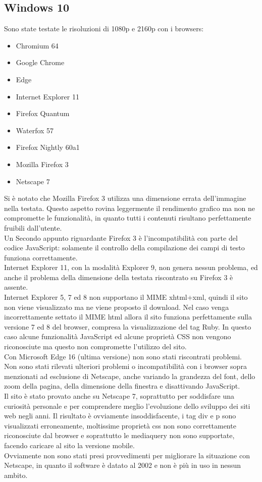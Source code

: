 \documentclass[openany, a4paper, 12pt]{report}
\begin{document}
				\subsection{Windows 10}
				Sono state testate le risoluzioni di 1080p e 2160p con i browsers:
				\begin{itemize}
					\item Chromium 64
					\item Google Chrome
					\item Edge
					\item Internet Explorer 11
					\item Firefox Quantum
					\item Waterfox 57
					\item Firefox Nightly 60a1
					\item Mozilla Firefox 3
					\item Netscape 7
				\end{itemize}
				Si è notato che Mozilla Firefox 3 utilizza una dimensione errata dell'immagine nella testata. Questo aspetto rovina leggermente il rendimento grafico ma non ne compromette le funzionalità, in quanto tutti i contenuti risultano perfettamente fruibili dall'utente.\\
				Un Secondo appunto riguardante Firefox 3 è l'incompatibilità con parte del codice JavaScript: solamente il controllo della compilazione dei campi di testo funziona correttamente.\\
				Internet Explorer 11, con la modalità Explorer 9, non genera nessun problema, ed anche il problema della dimensione della testata riscontrato su Firefox 3 è assente.\\
				Internet Explorer 5, 7 ed 8 non supportano il MIME xhtml+xml, quindi il sito non viene visualizzato ma ne viene proposto il download. Nel caso venga incorrettamente settato il MIME html allora il sito funziona perfettamente sulla versione 7 ed 8 del browser, compresa la visualizzazione del tag Ruby. In questo caso alcune funzionalità JavaScript ed alcune proprietà CSS non vengono riconosciute ma questo non compromette l'utilizzo del sito.\\ 
				Con Microsoft Edge 16 (ultima versione) non sono stati riscontrati problemi. \\
				Non sono stati rilevati ulteriori problemi o incompatibilità con i browser sopra menzionati ad esclusione di Netscape, anche variando la grandezza del font, dello zoom della pagina, della dimensione della finestra e disattivando JavaScript.\\
				Il sito è stato provato anche su Netscape 7, soprattutto per soddisfare una curiosità personale e per comprendere meglio l'evoluzione dello sviluppo dei siti web negli anni. Il risultato è ovviamente insoddisfacente, i tag div e p sono visualizzati erroneamente, moltissime proprietà css non sono correttamente riconosciute dal browser e soprattutto le mediaquery non sono supportate, facendo caricare al sito la versione mobile.\\
				Ovviamente non sono stati presi provvedimenti per migliorare la situazione con Netscape, in quanto il software è datato al 2002 e non è più in uso in nessun ambito.
				
\end{document}
